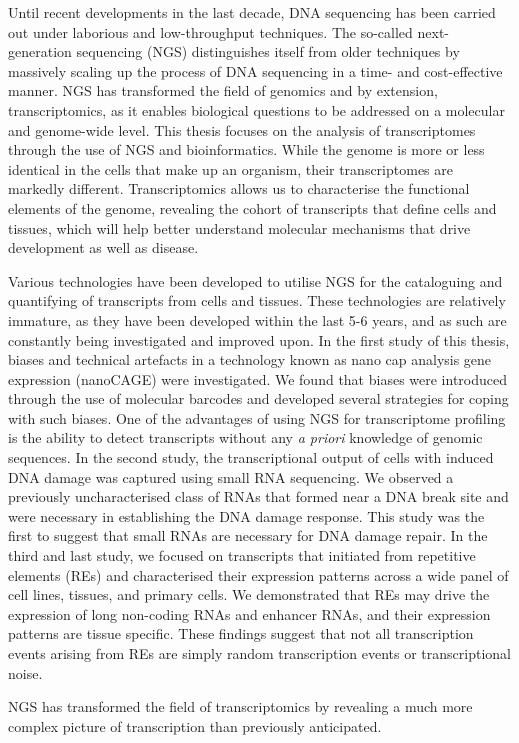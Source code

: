 Until recent developments in the last decade, DNA sequencing has been carried out under laborious and low-throughput techniques. The so-called next-generation sequencing (NGS) distinguishes itself from older techniques by massively scaling up the process of DNA sequencing in a time- and cost-effective manner. NGS has transformed the field of genomics and by extension, transcriptomics, as it enables biological questions to be addressed on a molecular and genome-wide level. This thesis focuses on the analysis of transcriptomes through the use of NGS and bioinformatics. While the genome is more or less identical in the cells that make up an organism, their transcriptomes are markedly different. Transcriptomics allows us to characterise the functional elements of the genome, revealing the cohort of transcripts that define cells and tissues, which will help better understand molecular mechanisms that drive development as well as disease.

Various technologies have been developed to utilise NGS for the cataloguing and quantifying of transcripts from cells and tissues. These technologies are relatively immature, as they have been developed within the last 5-6 years, and as such are constantly being investigated and improved upon. In the first study of this thesis, biases and technical artefacts in a technology known as nano cap analysis gene expression (nanoCAGE) were investigated. We found that biases were introduced through the use of molecular barcodes and developed several strategies for coping with such biases. One of the advantages of using NGS for transcriptome profiling is the ability to detect transcripts without any \textit{a priori} knowledge of genomic sequences. In the second study, the transcriptional output of cells with induced DNA damage was captured using small RNA sequencing. We observed a previously uncharacterised class of RNAs that formed near a DNA break site and were necessary in establishing the DNA damage response. This study was the first to suggest that small RNAs are necessary for DNA damage repair. In the third and last study, we focused on transcripts that initiated from repetitive elements (REs) and characterised their expression patterns across a wide panel of cell lines, tissues, and primary cells. We demonstrated that REs may drive the expression of long non-coding RNAs and enhancer RNAs, and their expression patterns are tissue specific. These findings suggest that not all transcription events arising from REs are simply random transcription events or transcriptional noise.

NGS has transformed the field of transcriptomics by revealing a much more complex picture of transcription than previously anticipated. 
